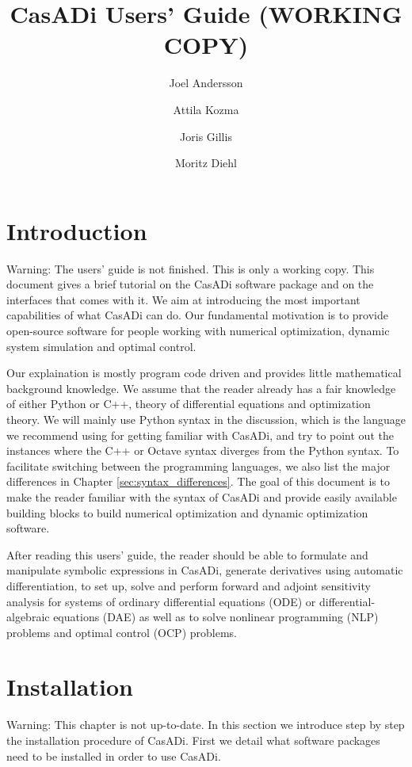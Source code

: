 \documentclass[a4paper,12pt]{book}
\author{Joel Andersson \and Attila Kozma \and Joris Gillis \and Moritz Diehl}
\title{CasADi Users' Guide {\color{red}(WORKING COPY)}}
\begin{document}
\titlepage
\maketitle
\begin{latexonly}
\tableofcontents
\end{latexonly}
\clearpage

\chapter{Introduction}
{\color{red}Warning: The users' guide is not finished. This is only a working copy.}
This document gives a brief tutorial on the CasADi software package and on the interfaces that comes with it. We aim at
introducing the most important capabilities of what CasADi can do. Our fundamental motivation is to provide open-source
software for people working with numerical optimization, dynamic system simulation and optimal control.

Our explaination is mostly program code driven and provides little mathematical background knowledge. We assume that the reader already has a fair knowledge of either Python or C++, theory of differential equations and optimization theory. We will mainly use Python syntax in the discussion, which is the language we recommend using for getting familiar with CasADi, and try to point out the instances where the C++ or Octave syntax diverges from the Python syntax. To facilitate switching between the programming languages, we also list the major differences in Chapter \ref{sec:syntax_differences}. The goal of this document is to make the reader familiar with the syntax of CasADi and provide easily available building blocks to build numerical optimization and dynamic optimization software.

After reading this users' guide, the reader should be able to formulate and manipulate symbolic expressions in CasADi, generate derivatives using automatic differentiation, to set up, solve and perform forward and adjoint sensitivity analysis for systems of ordinary differential equations (ODE) or differential-algebraic equations (DAE) as well as to solve nonlinear programming (NLP) problems and optimal control (OCP) problems.

\chapter{Installation}
{\color{red}Warning: This chapter is not up-to-date.}
In this section we introduce step by step the installation procedure of CasADi. First we detail what software packages need to
be installed in order to use CasADi.
\end{document}
